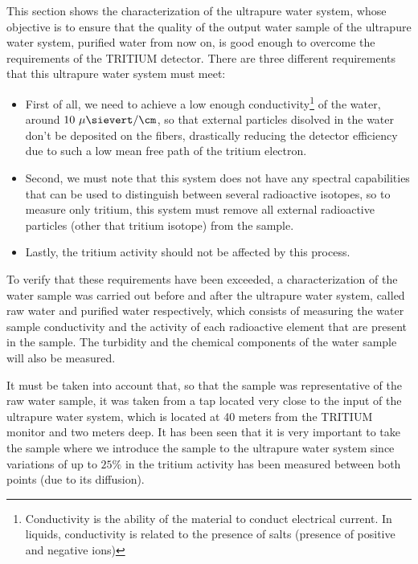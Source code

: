This section shows the characterization of the ultrapure water system, whose objective is to ensure that the quality of the output water sample of the ultrapure water system, purified water from now on, is good enough to overcome the requirements of the TRITIUM detector. There are three different requirements that this ultrapure water system must meet:

\begin{itemize}
\item{} First of all, we need to achieve a low enough conductivity\footnote{Conductivity is the ability of the material to conduct electrical current. In liquids, conductivity is related to the presence of salts (presence of positive and negative ions)} of the water, around $10~\mu\sievert/\cm$, so that external particles disolved in the water don't be deposited on the fibers, drastically reducing the detector efficiency due to such a low mean free path of the tritium electron.

\item{} Second, we must note that this system does not have any spectral capabilities that can be used to distinguish between several radioactive isotopes, so to measure only tritium, this system must remove all external radioactive particles (other that tritium isotope) from the sample.

\item{} Lastly, the tritium activity should not be affected by this process. 

\end{itemize}

To verify that these requirements have been exceeded, a characterization of the water sample was carried out before and after the ultrapure water system, called raw water and purified water respectively, which consists of measuring the water sample conductivity and the activity of each radioactive element that are present in the sample. The turbidity and the chemical components of the water sample will also be measured.

It must be taken into account that, so that the sample was representative of the raw water sample, it was taken from a tap located very close to the input of the ultrapure water system, which is located at 40 meters from the TRITIUM monitor and two meters deep. It has been seen that it is very important to take the sample where we introduce the sample to the ultrapure water system since variations of up to $25\%$ in the tritium activity has been measured between both points (due to its diffusion).

